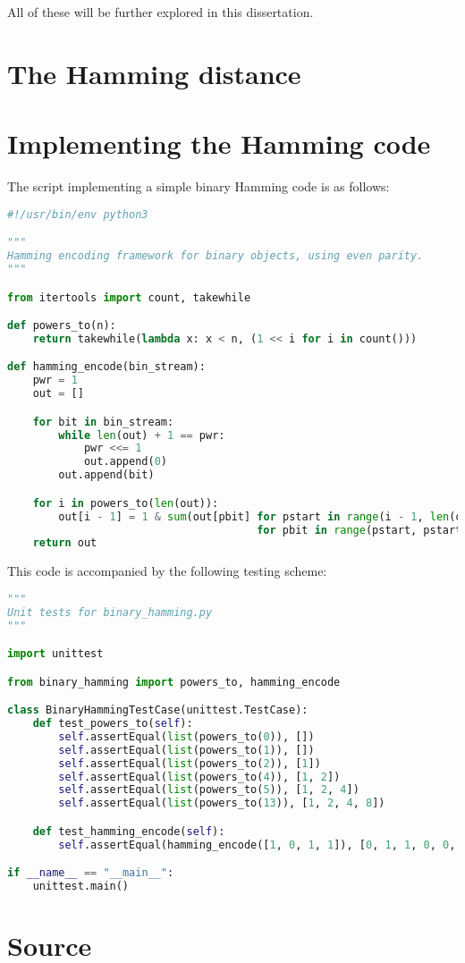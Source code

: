 \documentclass{article}
\begin{document}
    All of these will be further explored in this dissertation.

    \section{The Hamming distance}

    \section{Implementing the Hamming code}

    The script implementing a simple binary Hamming code is as follows:

\begin{lstlisting}[language=Python, caption=Binary Hamming code in Python]
#!/usr/bin/env python3

"""
Hamming encoding framework for binary objects, using even parity.
"""

from itertools import count, takewhile

def powers_to(n):
    return takewhile(lambda x: x < n, (1 << i for i in count()))

def hamming_encode(bin_stream):
    pwr = 1
    out = []

    for bit in bin_stream:
        while len(out) + 1 == pwr:
            pwr <<= 1
            out.append(0)
        out.append(bit)

    for i in powers_to(len(out)):
        out[i - 1] = 1 & sum(out[pbit] for pstart in range(i - 1, len(out), i << 1)
                                       for pbit in range(pstart, pstart + i))
    return out
\end{lstlisting}

    This code is accompanied by the following testing scheme:

\begin{lstlisting}[language=Python, caption=binary\_hamming unit tests]
"""
Unit tests for binary_hamming.py
"""

import unittest

from binary_hamming import powers_to, hamming_encode

class BinaryHammingTestCase(unittest.TestCase):
    def test_powers_to(self):
        self.assertEqual(list(powers_to(0)), [])
        self.assertEqual(list(powers_to(1)), [])
        self.assertEqual(list(powers_to(2)), [1])
        self.assertEqual(list(powers_to(4)), [1, 2])
        self.assertEqual(list(powers_to(5)), [1, 2, 4])
        self.assertEqual(list(powers_to(13)), [1, 2, 4, 8])

    def test_hamming_encode(self):
        self.assertEqual(hamming_encode([1, 0, 1, 1]), [0, 1, 1, 0, 0, 1, 1])

if __name__ == "__main__":
    unittest.main()
\end{lstlisting}

    \section{Source}

\nocite{CodeIntro}
\nocite{Hamming}
\nocite{HammingBarcodes}
\nocite{Shannon}
\nocite{PolynomialCodes}
\nocite{Hadamard}
{}

\end{document}
